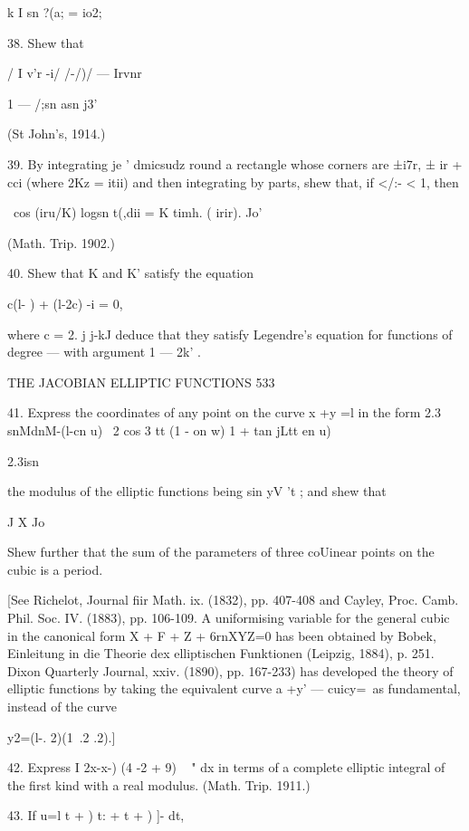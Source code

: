 k I sn ?(a;  = io2; 



38. Shew that 

/  I v'r  -i/ /-/)/ — Irvnr 

1 — /;sn asn j3' 

(St John's, 1914.) 

39. By integrating je ' dmicsudz round a rectangle whose corners are ±i7r, 
± ir + cci (where 2Kz = itii) and then integrating by parts, shew that, if </:- < 1, then 

\ cos (iru/K) logsn t(,dii =   K timh. ( irir). 
Jo' 

(Math. Trip. 1902.) 

40. Shew that K and K' satisfy the equation 

c(l- )  + (l-2c) -i  = 0, 

where c =  2. j j-kJ deduce that they satisfy Legendre's equation for functions of degree 
—   with argument 1 — 2k' . 



THE JACOBIAN ELLIPTIC FUNCTIONS 533 

41. Express the coordinates of any point on the curve x +y =l in the form 
  2.3 snMdnM-(l-cn u)  \  2  cos  3  tt (1 - on w)  1 + tan jLtt en u) 

2.3isn%

the modulus of the elliptic functions being sin yV 't ; and shew that 

J X Jo 

Shew further that the sum of the parameters of three coUinear points on the cubic is a 
period. 

[See Richelot, Journal fiir Math. ix. (1832), pp. 407-408 and Cayley, Proc. Camb. Phil. 
Soc. IV. (1883), pp. 106-109. A uniformising variable for the general cubic in the canonical 
form X + F  + Z  + 6rnXYZ=0 has been obtained by Bobek, Einleitung in die Theorie dex 
elliptischen Funktionen (Leipzig, 1884), p. 251. Dixon  Quarterly Journal, xxiv. (1890), 
pp. 167-233) has developed the theory of elliptic functions by taking the equivalent curve 
a +y' —  cuicy=\ as fundamental, instead of the curve 

y2=(l-. 2)(1\  .2 .2).] 

42. Express I   2x-x-) (4 -2 + 9)  ~ " dx in terms of a complete elliptic integral of the 
first kind with a real modulus. (Math. Trip. 1911.) 

43. If u=l   t +  )  t:  + t +  ) ]- dt, 


